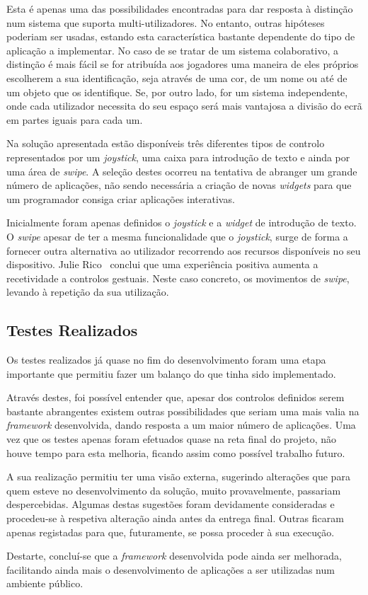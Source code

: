Esta é apenas uma das possibilidades encontradas para dar resposta à distinção num sistema que suporta multi-utilizadores. No entanto, outras hipóteses poderiam ser usadas, estando esta característica bastante dependente do tipo de aplicação a implementar. No caso de se tratar de um sistema colaborativo, a distinção é mais fácil se for atribuída aos jogadores uma maneira de eles próprios escolherem a sua identificação, seja através de uma cor, de um nome ou até de um objeto que os identifique. Se, por outro lado, for um sistema independente, onde cada utilizador necessita do seu espaço será mais vantajosa a divisão do ecrã em partes iguais para cada um.

Na solução apresentada estão disponíveis três diferentes tipos de controlo representados por um \textit{joystick}, uma caixa para introdução de texto e ainda por uma área de \textit{swipe}. A seleção destes ocorreu na tentativa de abranger um grande número de aplicações, não sendo necessária a criação de novas \textit{widgets} para que um programador consiga criar aplicações interativas. 

Inicialmente foram apenas definidos o \textit{joystick} e a \textit{widget} de introdução de texto. O \textit{swipe} apesar de ter a mesma funcionalidade que o \textit{joystick}, surge de forma a fornecer outra alternativa ao utilizador recorrendo aos recursos disponíveis no seu dispositivo. 
Julie Rico~\cite{Rico2010} conclui que uma experiência positiva aumenta a recetividade a controlos gestuais. Neste caso concreto, os movimentos de \textit{swipe}, levando à repetição da sua utilização.  


\subsection*{Testes Realizados}

Os testes realizados já quase no fim do desenvolvimento foram uma etapa importante que permitiu fazer um balanço do que tinha sido implementado.

Através destes, foi possível entender que, apesar dos controlos definidos serem bastante abrangentes existem outras possibilidades que seriam uma mais valia na \textit{framework} desenvolvida, dando resposta a um maior número de aplicações. Uma vez que os testes apenas foram efetuados quase na reta final do projeto, não houve tempo para esta melhoria, ficando assim como possível trabalho futuro.

A sua realização permitiu ter uma visão externa, sugerindo alterações que para quem esteve no desenvolvimento da solução, muito provavelmente, passariam despercebidas. Algumas destas sugestões foram devidamente consideradas e procedeu-se à respetiva alteração ainda antes da entrega final. Outras ficaram apenas registadas para que, futuramente, se possa proceder à sua execução.

Destarte, concluí-se que a \textit{framework} desenvolvida pode ainda ser melhorada, facilitando ainda mais o desenvolvimento de aplicações a ser utilizadas num ambiente público.









